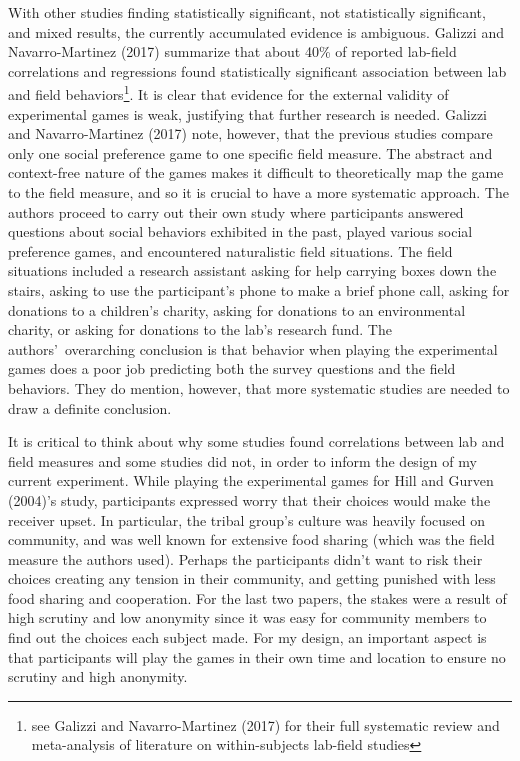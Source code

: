 \documentclass[12pt]{article}
\begin{document}
With other studies finding statistically significant, not statistically significant, and mixed results, the currently accumulated evidence is ambiguous. Galizzi and Navarro-Martinez (2017) summarize that about 40\% of reported lab-field correlations and regressions found statistically significant association between lab and field behaviors\footnote{see Galizzi and Navarro-Martinez (2017) for their full systematic review and meta-analysis of literature on within-subjects lab-field studies}. It is clear that evidence for the external validity of experimental games is weak, justifying that further research is needed. Galizzi and Navarro-Martinez (2017) note, however, that the previous studies compare only one social preference game to one specific field measure. The abstract and context-free nature of the games makes it difficult to theoretically map the game to the field measure, and so it is crucial to have a more systematic approach. The authors proceed to carry out their own study where participants answered questions about social behaviors exhibited in the past, played various social preference games, and encountered naturalistic field situations. The field situations included a research assistant asking for help carrying boxes down the stairs, asking to use the participant\rq s phone to make a brief phone call, asking for donations to a children\rq s charity, asking for donations to an environmental charity, or asking for donations to the lab\rq s research fund.  The authors\rq \ overarching conclusion is that behavior when playing the experimental games does a poor job predicting both the survey questions and the field behaviors. They do mention, however, that more systematic studies are needed to draw a definite conclusion.

It is critical to think about why some studies found correlations between lab and field measures and some studies did not, in order to inform the design of my current experiment. {\color{red}While playing the experimental games for Hill and Gurven (2004)\rq s study}, participants expressed worry that their choices would make the receiver upset. In particular, the tribal group\rq s culture was heavily focused on community, and was well known for extensive food sharing (which was the field measure the authors used). Perhaps the participants didn\rq t want to risk their choices creating any tension in their community, and getting punished with less food sharing and cooperation. For the last two papers, the stakes were a result of high scrutiny and low anonymity since it was easy for community members to find out the choices each subject made. For my design, an important aspect is that participants will play the games in their own time and location to ensure no scrutiny and high anonymity.
\end{document}
